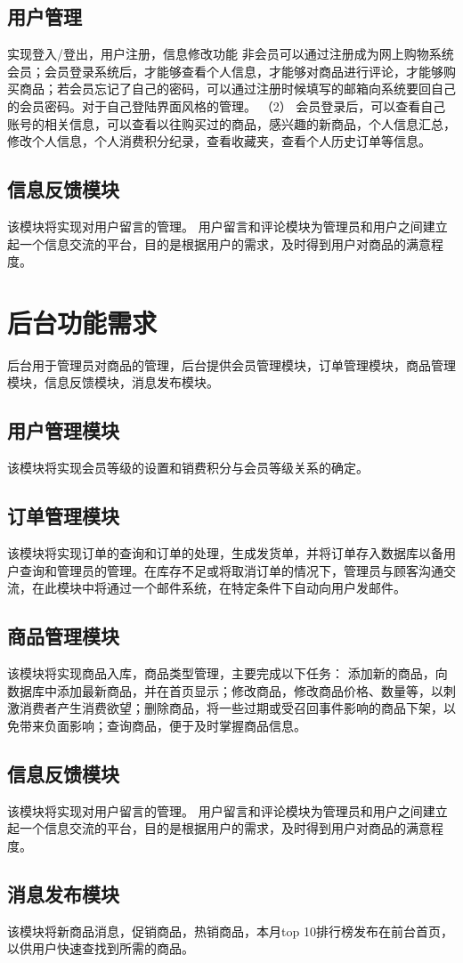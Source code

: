 \documentclass[UTF8, a4paper]{ctexrep}
\begin{document}
	\subsection{用户管理}
	实现登入/登出，用户注册，信息修改功能
	非会员可以通过注册成为网上购物系统会员；会员登录系统后，才能够查看个人信息，才能够对商品进行评论，才能够购买商品；若会员忘记了自己的密码，可以通过注册时候填写的邮箱向系统要回自己的会员密码。对于自己登陆界面风格的管理。
	（2） 会员登录后，可以查看自己账号的相关信息，可以查看以往购买过的商品，感兴趣的新商品，个人信息汇总，修改个人信息，个人消费积分纪录，查看收藏夹，查看个人历史订单等信息。
	\subsection{信息反馈模块}
	该模块将实现对用户留言的管理。 用户留言和评论模块为管理员和用户之间建立起一个信息交流的平台，目的是根据用户的需求，及时得到用户对商品的满意程度。
	
	\section{后台功能需求}
	后台用于管理员对商品的管理，后台提供会员管理模块，订单管理模块，商品管理模块，信息反馈模块，消息发布模块。
	\subsection{用户管理模块}
	该模块将实现会员等级的设置和销费积分与会员等级关系的确定。
	\subsection{订单管理模块}
	该模块将实现订单的查询和订单的处理，生成发货单，并将订单存入数据库以备用户查询和管理员的管理。在库存不足或将取消订单的情况下，管理员与顾客沟通交流，在此模块中将通过一个邮件系统，在特定条件下自动向用户发邮件。
	\subsection{商品管理模块}
	该模块将实现商品入库，商品类型管理，主要完成以下任务：
	添加新的商品，向数据库中添加最新商品，并在首页显示；修改商品，修改商品价格、数量等，以刺激消费者产生消费欲望；删除商品，将一些过期或受召回事件影响的商品下架，以免带来负面影响；查询商品，便于及时掌握商品信息。	
	\subsection{信息反馈模块}
	该模块将实现对用户留言的管理。 用户留言和评论模块为管理员和用户之间建立起一个信息交流的平台，目的是根据用户的需求，及时得到用户对商品的满意程度。
	\subsection{消息发布模块}
	该模块将新商品消息，促销商品，热销商品，本月top 10排行榜发布在前台首页，以供用户快速查找到所需的商品。
	
\end{document}
